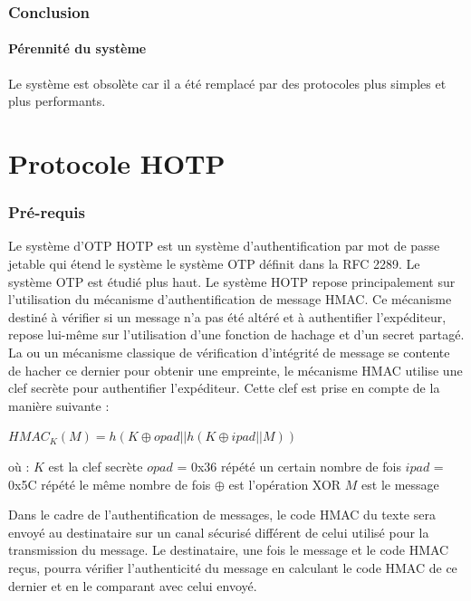 \documentclass{../res/univ-projet}
\begin{document}
\section{Conclusion}
  \subsection{Pérennité du système}
    Le système est obsolète car il a été remplacé par des protocoles plus simples et plus performants.

\part{Protocole HOTP}
\setcounter{section}{0}
\section{Pré-requis}
Le système d'OTP \og{}HOTP\fg{} est un système d'authentification par mot de passe jetable qui étend le système le système OTP définit dans la RFC 2289. Le système OTP 
est étudié plus haut.
Le système HOTP repose principalement sur l'utilisation du mécanisme d'authentification de message HMAC. Ce mécanisme destiné à vérifier si un message n'a pas été altéré
et à authentifier l'expéditeur, repose lui-même sur l'utilisation d'une fonction de hachage et d'un secret partagé. La ou un mécanisme classique de vérification 
d'intégrité de message se contente de hacher ce dernier pour obtenir une empreinte, le mécanisme HMAC utilise une clef secrète pour authentifier l'expéditeur. Cette clef 
est prise en compte de la manière suivante : 
\begin{center}
$HMAC_K(M) = h(K \oplus opad || h(K \oplus ipad || M))$ 
\end{center}
où :\newline
$K$ est la clef secrète \newline
$opad$ = 0x36 répété un certain nombre de fois \newline
$ipad$ = 0x5C répété le même nombre de fois \newline
$\oplus$ est l'opération XOR \newline
$M$ est le message \newline


Dans le cadre de l'authentification de messages, le code HMAC du texte sera envoyé au destinataire sur un canal sécurisé différent de celui utilisé pour la transmission
du message. Le destinataire, une fois le message et le code HMAC reçus, pourra vérifier l'authenticité du message en calculant le code HMAC de ce dernier et en le 
comparant avec celui envoyé.
\end{document}

